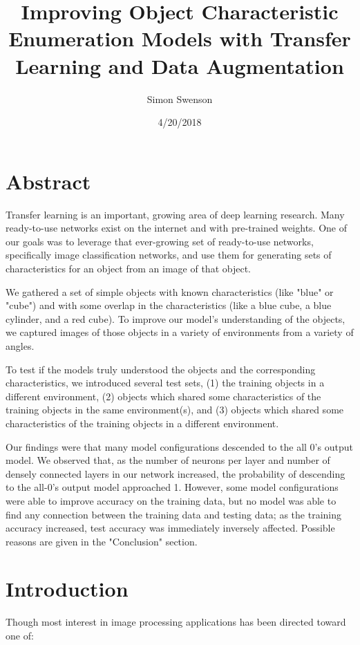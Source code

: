 \documentclass{article}
\title{Improving Object Characteristic Enumeration Models with Transfer Learning and Data Augmentation}
\date{4/20/2018}
\author{Simon Swenson}
\begin{document}
\maketitle
{}
\newpage
{}

\section{Abstract}

Transfer learning is an important, growing area of deep learning research. Many ready-to-use networks exist on the internet and with pre-trained weights. One of our goals was to leverage that ever-growing set of ready-to-use networks, specifically image classification networks, and use them for generating sets of characteristics for an object from an image of that object.

We gathered a set of simple objects with known characteristics (like "blue" or "cube") and with some overlap in the characteristics (like a blue cube, a blue cylinder, and a red cube). To improve our model's understanding of the objects, we captured images of those objects in a variety of environments from a variety of angles.

To test if the models truly understood the objects and the corresponding characteristics, we introduced several test sets, (1) the training objects in a different environment, (2) objects which shared some characteristics of the training objects in the same environment(s), and (3) objects which shared some characteristics of the training objects in a different environment.

Our findings were that many model configurations descended to the all 0's output model. We observed that, as the number of neurons per layer and number of densely connected layers in our network increased, the probability of descending to the all-0's output model approached 1. However, some model configurations were able to improve accuracy on the training data, but no model was able to find any connection between the training data and testing data; as the training accuracy increased, test accuracy was immediately inversely affected. Possible reasons are given in the "Conclusion" section.

\section{Introduction}

Though most interest in image processing applications has been directed toward one of:
\end{document}
